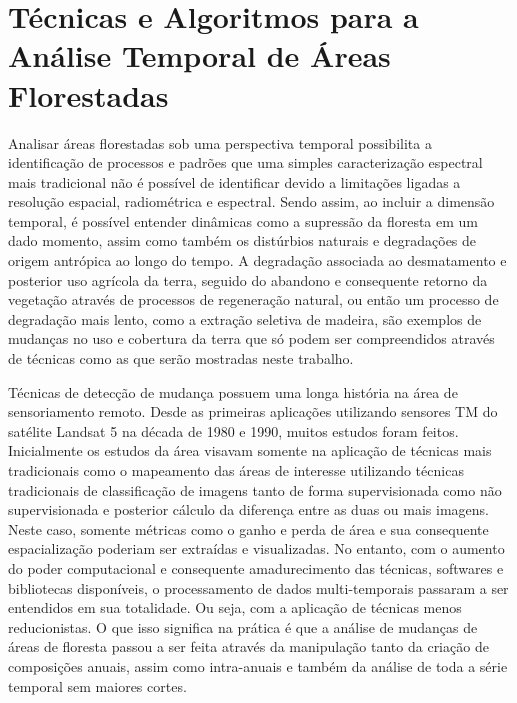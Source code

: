 \documentclass[twocolumn]{article}
\begin{document}
\section{Técnicas e Algoritmos para a Análise Temporal de Áreas Florestadas}
Analisar áreas florestadas sob uma perspectiva temporal possibilita a identificação de processos e padrões que uma simples caracterização espectral mais tradicional não é possível de identificar devido a limitações ligadas a resolução espacial, radiométrica e espectral. Sendo assim, ao incluir a dimensão temporal, é possível entender dinâmicas como a supressão da floresta em um dado momento, assim como também os distúrbios naturais e degradações de origem antrópica ao longo do tempo.
A degradação associada ao desmatamento e posterior uso agrícola da terra, seguido do abandono e consequente retorno da vegetação através de processos de regeneração natural, ou então um processo de degradação mais lento, como a extração seletiva de madeira, são exemplos de mudanças no uso e cobertura da terra que só podem ser compreendidos através de técnicas como as que serão mostradas neste trabalho. 
\par
Técnicas de detecção de mudança possuem uma longa história na área de sensoriamento remoto. Desde as primeiras aplicações utilizando sensores TM do satélite Landsat 5 na década de 1980 e 1990, muitos estudos foram feitos. Inicialmente os estudos da área visavam somente na aplicação de técnicas mais tradicionais como o mapeamento das áreas de interesse utilizando técnicas tradicionais de classificação de imagens tanto de forma supervisionada como não supervisionada e posterior cálculo da diferença entre as duas ou mais imagens. Neste caso, somente métricas como o ganho e perda de área e sua consequente espacialização poderiam ser extraídas e visualizadas. No entanto, com o aumento do poder computacional e consequente amadurecimento das técnicas, softwares e bibliotecas disponíveis, o processamento de dados multi-temporais passaram a ser entendidos em sua totalidade. Ou seja, com a aplicação de técnicas menos reducionistas. O que isso significa na prática é que a análise de mudanças de áreas de floresta passou a ser feita através da manipulação tanto da criação de composições anuais, assim como intra-anuais e também da análise de toda a série temporal sem maiores cortes.
\par
\end{document}

